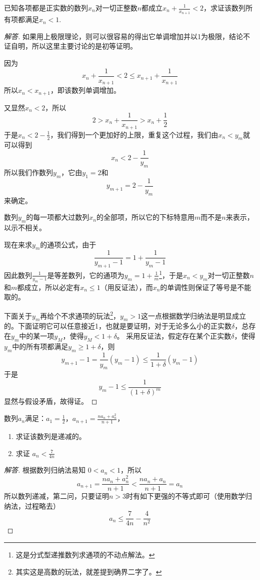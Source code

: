 \begin{exercise}
  已知各项都是正实数的数列$x_n$对一切正整数$n$都成立$x_n+\frac{1}{x_{n+1}}<2$，求证该数列所有项都满足$x_n<1$.
\end{exercise}
\begin{proof}[解答]
  如果用上极限理论，则可以很容易的得出它单调增加并以1为极限，结论不证自明，所以这里主要讨论的是初等证明。

因为
$$
x_n+\frac{1}{x_{n+1}}<2 \leqslant 
x_{n+1}+\frac{1}{x_{n+1}}
$$
所以$x_n<x_{n+1}$，即该数列单调增加。

又显然$x_n<2$，所以
$$
2>x_n+\frac{1}{x_{n+1}}>x_n+\frac{1}{2}
$$
于是$x_n<2-\frac{1}{2}$，我们得到一个更加好的上限，重复这个过程，我们由$x_n<y_m$就可以得到
$$
x_n<2-\frac{1}{y_m}
$$
所以我们作数列$y_m$，它由$y_1=2$和
$$
y_{m+1}=2-\frac{1}{y_m}
$$
来确定。

数列$y_m$的每一项都大过数列$x_n$的全部项，所以它的下标特意用$m$而不是$n$来表示，以示不相关。

现在来求$y_m$的通项公式，由于
$$
\frac{1}{y_{m+1}-1}=1+\frac{1}{y_{m}-1}
$$
因此数列$\frac{1}{y_m-1}$是等差数列，它的通项为$y_m=1+\frac{1}{m}$\footnote{这是分式型递推数列求通项的不动点解法。}，于是$x_n<y_m$对一切正整数$n$和$m$都成立，所以必定有$x_n\leqslant 1$（用反证法），而$x_n$的单调性则保证了等号是不能取的。

下面关于$y_m$再给个不求通项的玩法\footnote{其实这是高数的玩法，就差提到确界二字了。}，$y_m>1$这一点根据数学归纳法是明显成立的。下面证明它可以任意接近1，也就是要证明，对于无论多么小的正实数$\delta$，总存在$y_m$中的某一项$y_M$，使得$y_M<1+\delta$。
采用反证法，假定存在某个正实数$\delta$，使得$y_m$中的所有项都满足$y_m\geqslant 1+\delta$，则
$$
y_{m+1}-1=\frac{1}{y_m}(y_m-1)\leqslant 
\frac{1}{1+\delta}(y_m-1)
$$
于是
$$
y_m-1\leqslant \frac{1}{(1+\delta)^m}
$$
显然与假设矛盾，故得证。
\end{proof}

\begin{exercise}
  数列$a_n$满足：$a_1=\frac{1}{2}$，$a_{n+1}=\frac{na_n+a_n^2}{n+1}$，
  \begin{enumerate}
  \item 求证该数列是递减的。
  \item 求证 $a_n < \frac{7}{4n}$
  \end{enumerate}
\end{exercise}
\begin{proof}[解答]
  根据数列归纳法易知 $0<a_n<1$，所以
  \begin{equation*}
    a_{n+1}=\frac{na_n+a_n^2}{n+1} < \frac{na_n+a_n}{n+1} = a_n
  \end{equation*}
  所以数列递减，第二问，只要证明$n>3$时有如下更强的不等式即可（使用数学归纳法，过程略去）
  \begin{equation*}
    a_n \leqslant \frac{7}{4n}-\frac{4}{n^2}
  \end{equation*}
\end{proof}

